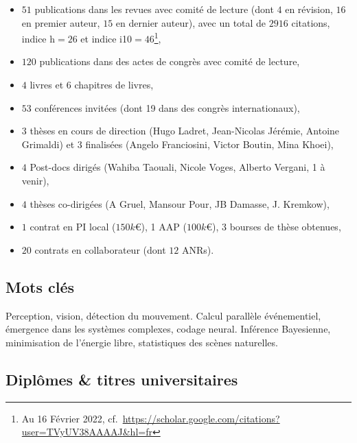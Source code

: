 \documentclass[10pt,french,a4paper,oneside]{article}%
\begin{document}
\begin{itemize}

\item  	$51$ publications dans les revues avec comité de lecture (dont $4$ en révision, $16$ en premier auteur, $15$ en dernier auteur), avec un total de $2916$ citations, indice h$=26$ et  indice i10$=46$\footnote{Au 16 Février 2022, cf.~\url{https://scholar.google.com/citations?user=TVyUV38AAAAJ&hl=fr}},
\item	$120$ publications dans des actes de congrès avec comité de lecture,
\item	$4$ livres et $6$ chapitres de livres,
\item	$53$ conférences invitées (dont 19 dans des congrès internationaux),
\item	$3$ thèses en cours de direction (Hugo Ladret, Jean-Nicolas Jérémie, Antoine Grimaldi) et $3$ finalisées (Angelo Franciosini, Victor Boutin, Mina Khoei),
\item	$4$ Post-docs dirigés (Wahiba Taouali, Nicole Voges, Alberto Vergani, 1 à venir),
\item	$4$ thèses co-dirigées (A Gruel, Mansour Pour, JB Damasse, J. Kremkow),
\item	$1$ contrat en PI local ($150 k$\euro{}), 1 AAP ($100 k$\euro{}), $3$ bourses de thèse obtenues,
\item	$20$ contrats en collaborateur (dont $12$ ANRs).

\end{itemize} %

\subsection*{Mots clés}
Perception, vision, détection du mouvement. Calcul parallèle événementiel, émergence dans les systèmes complexes, codage neural. Inférence Bayesienne, minimisation de l'énergie libre, statistiques des scènes naturelles.

\subsection{Diplômes \& titres universitaires}
\end{document}
